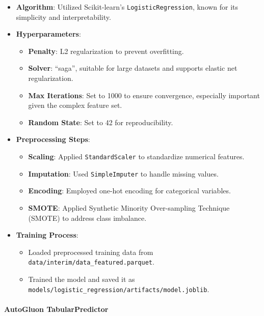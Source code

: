 \documentclass{article}
\begin{document}
\begin{itemize}[leftmargin=*]
    \item \textbf{Algorithm}: Utilized Scikit-learn's \texttt{LogisticRegression}, known for its simplicity and interpretability.
    \item \textbf{Hyperparameters}:
        \begin{itemize}[leftmargin=*]
            \item \textbf{Penalty}: L2 regularization to prevent overfitting.
            \item \textbf{Solver}: ``saga'', suitable for large datasets and supports elastic net regularization.
            \item \textbf{Max Iterations}: Set to 1000 to ensure convergence, especially important given the complex feature set.
            \item \textbf{Random State}: Set to 42 for reproducibility.
        \end{itemize}
    \item \textbf{Preprocessing Steps}:
        \begin{itemize}[leftmargin=*]
            \item \textbf{Scaling}: Applied \texttt{StandardScaler} to standardize numerical features.
            \item \textbf{Imputation}: Used \texttt{SimpleImputer} to handle missing values.
            \item \textbf{Encoding}: Employed one-hot encoding for categorical variables.
            \item \textbf{SMOTE}: Applied Synthetic Minority Over-sampling Technique (SMOTE) to address class imbalance.
        \end{itemize}
    \item \textbf{Training Process}:
        \begin{itemize}[leftmargin=*]
            \item Loaded preprocessed training data from \texttt{data/interim/data\_featured.parquet}.
            \item Trained the model and saved it as \texttt{models/logistic\_regression/artifacts/model.joblib}.
        \end{itemize}
\end{itemize}

\paragraph{AutoGluon TabularPredictor}
\end{document}

